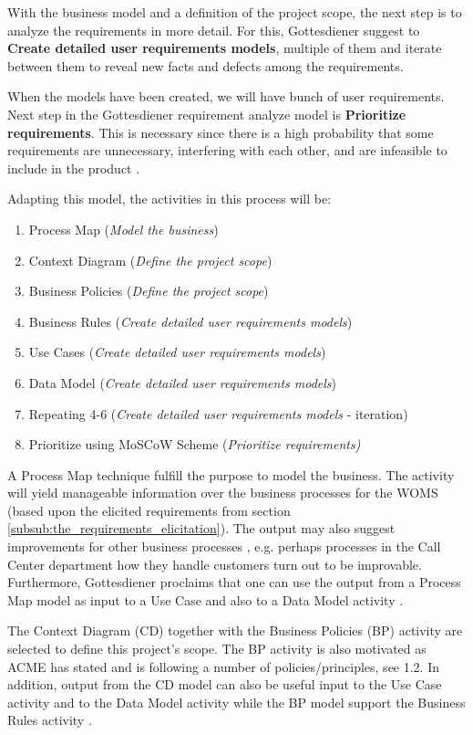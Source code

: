\documentclass[a4paper]{article}
\begin{document}
With the business model and a definition of the project scope, the next step is to analyze the requirements in more detail. For this, Gottesdiener suggest to \textbf{Create detailed user requirements models}, multiple of them and iterate between them to reveal new facts and defects among the requirements.
        
When the models have been created, we will have bunch of user requirements. Next step in the Gottesdiener requirement analyze model is \textbf{Prioritize requirements}. This is necessary since there is a high probability that some requirements are unnecessary, interfering with each other, and are infeasible to include in the product \cite{Lec5}.  

Adapting this model, the activities in this process will be:
\begin{enumerate}
\item Process Map (\emph{Model the business}) 
\item Context Diagram (\emph{Define the project scope})
\item Business Policies (\emph{Define the project scope})
\item Business Rules (\emph{Create detailed user requirements models})
\item Use Cases (\emph{Create detailed user requirements models})
\item Data Model (\emph{Create detailed user requirements models})
\item Repeating 4-6 (\emph{Create detailed user requirements models} - iteration)
\item Prioritize using MoSCoW Scheme (\emph{Prioritize requirements)}
\end{enumerate}



A Process Map technique fulfill the purpose to model the business. The activity will yield manageable information over the business processes for the WOMS (based upon the elicited requirements from section \ref{subsub:the_requirements_elicitation}). The output may also suggest improvements for other business processes \cite{gott4}, e.g. perhaps processes in the Call Center department how they handle customers turn out to be improvable. Furthermore, Gottesdiener proclaims that one can use the output from a Process Map model as input to a Use Case and also to a Data Model activity \cite{gott4}.

      The Context Diagram (CD) together with the Business Policies (BP) activity are selected to define this project's scope. The BP activity is also motivated as ACME has stated and is following a number of policies/principles, see 1.2. In addition, output from the CD model can also be useful input to the Use Case activity and to the Data Model activity \cite{gott4} while the BP model support the Business Rules activity \cite{gott4}.
\end{document}
